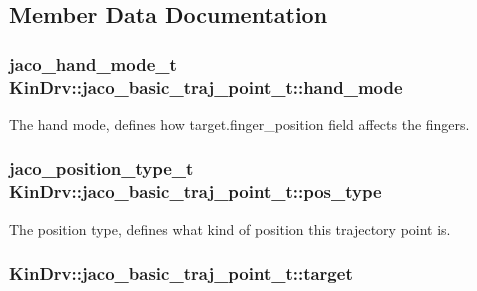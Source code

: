 \subsection{Member Data Documentation}
\hypertarget{structKinDrv_1_1jaco__basic__traj__point__t_a6ddcd7dd2d669ba0a6ab83101276c9bc}{
\subsubsection[{hand\+\_\+mode}]{\setlength{\rightskip}{0pt plus 5cm}jaco\+\_\+hand\+\_\+mode\+\_\+t Kin\+Drv\+::jaco\+\_\+basic\+\_\+traj\+\_\+point\+\_\+t\+::hand\+\_\+mode}}\label{structKinDrv_1_1jaco__basic__traj__point__t_a6ddcd7dd2d669ba0a6ab83101276c9bc}
The hand mode, defines how target.\+finger\+\_\+position field affects the fingers. \hypertarget{structKinDrv_1_1jaco__basic__traj__point__t_ae97f90e3b59790cc972512b61cab491c}{
\subsubsection[{pos\+\_\+type}]{\setlength{\rightskip}{0pt plus 5cm}jaco\+\_\+position\+\_\+type\+\_\+t Kin\+Drv\+::jaco\+\_\+basic\+\_\+traj\+\_\+point\+\_\+t\+::pos\+\_\+type}}\label{structKinDrv_1_1jaco__basic__traj__point__t_ae97f90e3b59790cc972512b61cab491c}
The position type, defines what kind of position this trajectory point is. \hypertarget{structKinDrv_1_1jaco__basic__traj__point__t_a254d00317a52c42023f94d7eea3cabf2}{
\subsubsection[{target}]{ Kin\+Drv\+::jaco\+\_\+basic\+\_\+traj\+\_\+point\+\_\+t\+::target}}\label{structKinDrv_1_1jaco__basic__traj__point__t_a254d00317a52c42023f94d7eea3cabf2}

